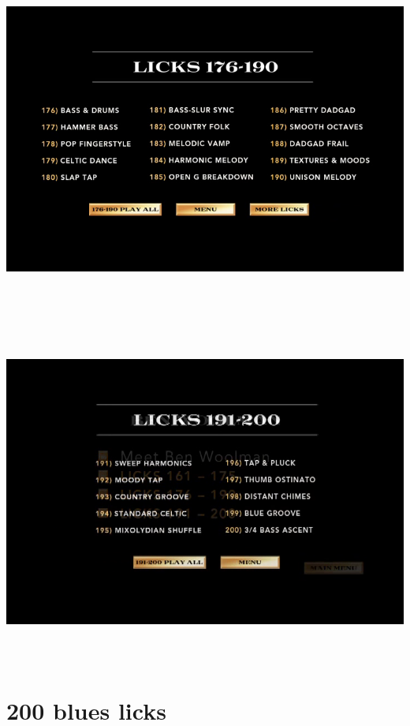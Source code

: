 \documentclass[a4paper]{book}
\begin{document}
\begin{center}
\includegraphics[width=17cm,height=11.333cm]{lebluessupportsmethodes-img14.png}
\end{center}



\clearpage

\begin{center}
\includegraphics[width=17cm,height=11.333cm]{lebluessupportsmethodes-img15.png}
\end{center}
\clearpage\section[200 blues licks]{200 blues licks}
\hypertarget{RefHeadingToc104973218262}{}
\end{document}
